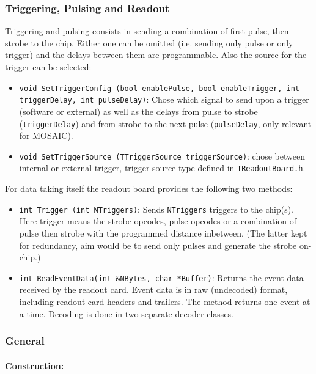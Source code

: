 \documentclass{article}
\begin{document}
\subsubsection{Triggering, Pulsing and Readout}

Triggering and pulsing consists in sending a combination of first pulse, then strobe to the chip. Either one can be omitted (i.e. sending only pulse or only trigger) and the delays between them are programmable. Also the source for the trigger can be selected: 

\begin{itemize}
\item \texttt{void SetTriggerConfig (bool enablePulse, bool
  enableTrigger, int triggerDelay, int pulseDelay)}: Chose which
signal to send upon a trigger (software or external) as well as the
delays from pulse to strobe (\texttt{triggerDelay}) and from strobe to
the next pulse (\texttt{pulseDelay}, only relevant for MOSAIC).
\item \texttt{void SetTriggerSource (TTriggerSource triggerSource)}:
  chose between internal or external trigger, trigger-source type
  defined in \texttt{TReadoutBoard.h}.
\end{itemize}


For data taking itself the readout board provides the following two methods: 

\begin{itemize}
\item \texttt{int Trigger (int NTriggers)}: Sends \texttt{NTriggers}
  triggers to the chip(s). Here trigger means the strobe opcodes,
  pulse opcodes or a combination of pulse then strobe with the
  programmed distance inbetween. (The latter kept for redundancy,
  aim would be to send only pulses and generate the strobe on-chip.)
\item \texttt{int ReadEventData(int \&NBytes, char *Buffer)}: Returns
  the event data received by the readout card. Event data is in raw
  (undecoded) format, including readout card headers and
  trailers. The method returns one event at a time. Decoding is done in
  two separate decoder classes.\end{itemize}





\subsubsection{General}


\paragraph {Construction:}
\end{document}
